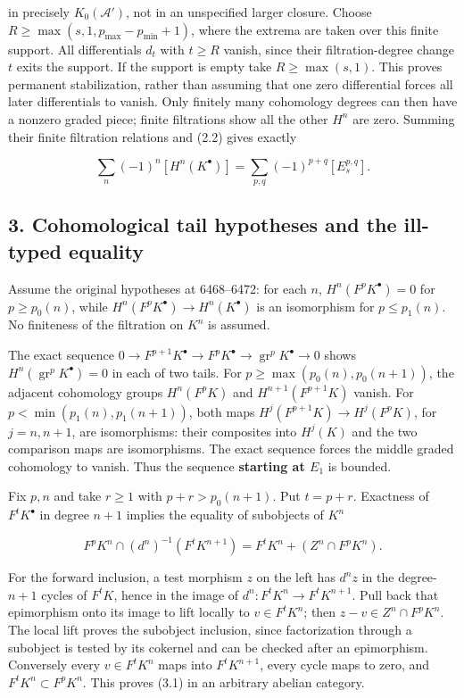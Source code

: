 in precisely \(K_0(\mathcal A')\), not in an unspecified larger closure. Choose \(R\geq\max(s,1,p_{\max}-p_{\min}+1)\), where the extrema are taken over this finite support. All differentials \(d_t\) with \(t\geq R\) vanish, since their filtration-degree change \(t\) exits the support. If the support is empty take \(R\geq\max(s,1)\). This proves permanent stabilization, rather than assuming that one zero differential forces all later differentials to vanish. Only finitely many cohomology degrees can then have a nonzero graded piece; finite filtrations show all the other \(H^n\) are zero. Summing their finite filtration relations and (2.2) gives exactly

\[
\sum_n(-1)^n[H^n(K^\bullet)]
=\sum_{p,q}(-1)^{p+q}[E_s^{p,q}].             \tag{2.3}
\]

\subsection{3. Cohomological tail hypotheses and the ill-typed equality}\label{note-07-cohomological-tail-hypotheses-and-the-ill-typed-equality}

Assume the original hypotheses at 6468--6472: for each \(n\), \(H^n(F^pK^\bullet)=0\) for \(p\geq p_0(n)\), while \(H^n(F^pK^\bullet)\to H^n(K^\bullet)\) is an isomorphism for \(p\leq p_1(n)\). No finiteness of the filtration on \(K^n\) is assumed.

The exact sequence \(0\to F^{p+1}K^\bullet\to F^pK^\bullet\to\operatorname{gr}^pK^\bullet\to0\) shows \(H^n(\operatorname{gr}^pK^\bullet)=0\) in each of two tails. For \(p\geq\max(p_0(n),p_0(n+1))\), the adjacent cohomology groups \(H^n(F^pK)\) and \(H^{n+1}(F^{p+1}K)\) vanish. For \(p<\min(p_1(n),p_1(n+1))\), both maps \(H^j(F^{p+1}K)\to H^j(F^pK)\), for \(j=n,n+1\), are isomorphisms: their composites into \(H^j(K)\) and the two comparison maps are isomorphisms. The exact sequence forces the middle graded cohomology to vanish. Thus the sequence \textbf{starting at \(E_1\)} is bounded.

Fix \(p,n\) and take \(r\geq1\) with \(p+r>p_0(n+1)\). Put \(t=p+r\). Exactness of \(F^tK^\bullet\) in degree \(n+1\) implies the equality of subobjects of \(K^n\)

\[
F^pK^n\cap(d^n)^{-1}(F^tK^{n+1})
=F^tK^n+(Z^n\cap F^pK^n).                  \tag{3.1}
\]

For the forward inclusion, a test morphism \(z\) on the left has \(d^nz\) in the degree-\(n+1\) cycles of \(F^tK\), hence in the image of \(d^n:F^tK^n\to F^tK^{n+1}\). Pull back that epimorphism onto its image to lift locally to \(v\in F^tK^n\); then \(z-v\in Z^n\cap F^pK^n\). The local lift proves the subobject inclusion, since factorization through a subobject is tested by its cokernel and can be checked after an epimorphism. Conversely every \(v\in F^tK^n\) maps into \(F^tK^{n+1}\), every cycle maps to zero, and \(F^tK^n\subset F^pK^n\). This proves (3.1) in an arbitrary abelian category.

